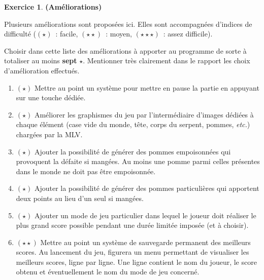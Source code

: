 \documentclass[11pt]{article}
\theoremstyle{definition}
\newtheorem{Exercice}{Exercice}
\begin{document}
\begin{Exercice} {\bf (Améliorations)}\smallskip

Plusieurs améliorations sont proposées ici. Elles sont accompagnées 
d'indices de difficulté ($(\star)$~: facile, $(\star\star)$~: moyen, 
$(\star\star\star)$~: assez difficile).
\medskip

Choisir dans cette liste des améliorations à apporter au programme de
sorte à totaliser au moins {\bf sept} $\star$. Mentionner très 
clairement dans le rapport les choix d'amélioration effectués.
\smallskip

\begin{enumerate}
    \item $(\star)$
    Mettre au point un système pour mettre en pause la partie
    en appuyant sur une touche dédiée.
    \smallskip
    
    \item $(\star)$
    Améliorer les graphismes du jeu par l'intermédiaire d'images 
    dédiées à chaque élément (case vide du monde, tête, corps du 
    serpent, pommes, {\em etc.}) chargées par la {\sf MLV}.
    \smallskip
    
    \item $(\star)$
    Ajouter la possibilité de générer des pommes empoisonnées
    qui provoquent la défaite si mangées. Au moins une pomme parmi
    celles présentes dans le monde ne doit pas être empoisonnée.
    \smallskip
    
    \item $(\star)$
    Ajouter la possibilité de générer des pommes particulières
    qui apportent deux points au lieu d'un seul si mangées.
    \smallskip
    
    \item $(\star)$
    Ajouter un mode de jeu particulier dans lequel le joueur doit 
    réaliser le plus grand score possible pendant une durée limitée
    imposée (et à choisir).
    \smallskip
    
    \item $(\star\star)$
    Mettre au point un système de sauvegarde permanent des meilleurs 
    scores. Au lancement du jeu, figurera un menu permettant de visualiser
    les meilleurs scores, ligne par ligne. Une ligne contient le nom
    du joueur, le score obtenu et éventuellement le nom du mode de 
    jeu concerné.
    \smallskip
    

\end{enumerate}
\end{Exercice}
\end{document}

